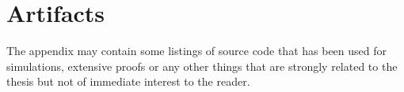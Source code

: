 \chapter{Artifacts}
The appendix may contain some listings of source code that has been used for simulations, extensive proofs or any other things that are strongly related to the thesis but not of immediate interest to the reader. 
